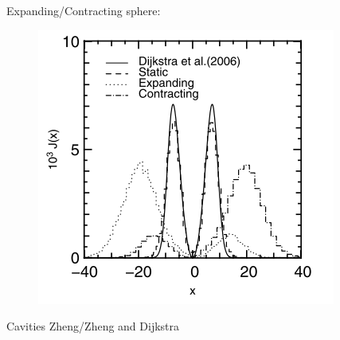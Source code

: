 \documentclass{beamer}
\begin{document}
\begin{frame}{Expanding/Contracting sphere:}
\begin{figure}
\includegraphics[scale=0.4]{Figures/expanding.png}
\end{figure}
\end{frame}

\begin{frame}{Cavities}
Zheng/Zheng and Dijkstra
\end{frame}
\end{document}
